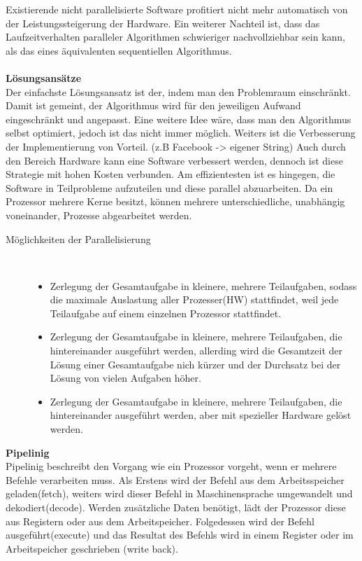 \documentclass[a4paper,12pt]{article}
\begin{document}
Existierende nicht parallelisierte Software profitiert nicht mehr automatisch von der Leistungssteigerung der Hardware. Ein weiterer Nachteil ist, dass das Laufzeitverhalten paralleler Algorithmen schwieriger nachvollziehbar sein kann, als das eines äquivalenten sequentiellen Algorithmus.\\\\
\textbf{Lösungsansätze\\}
Der einfachste Lösungsansatz ist der, indem man den Problemraum einschränkt. Damit ist gemeint, der Algorithmus wird für den jeweiligen Aufwand eingeschränkt und angepasst. Eine weitere Idee wäre, dass man den Algorithmus selbst optimiert, jedoch ist das nicht immer möglich. Weiters ist die Verbesserung der Implementierung von Vorteil. (z.B Facebook -> eigener String)
Auch durch den Bereich Hardware kann eine Software verbessert werden, dennoch ist diese Strategie mit hohen Kosten verbunden. Am effizientesten ist es hingegen, die Software in Teilprobleme aufzuteilen und diese parallel abzuarbeiten. Da ein Prozessor mehrere Kerne besitzt, können mehrere unterschiedliche, unabhängig voneinander, Prozesse abgearbeitet werden. 
\begin{description}
    \item[Möglichkeiten der Parallelisierung] ~\par
    \begin{itemize}
        \item Zerlegung der Gesamtaufgabe in kleinere, mehrere Teilaufgaben, sodass die maximale Auslastung aller Prozesser(HW) stattfindet, weil jede Teilaufgabe auf einem einzelnen Prozessor stattfindet.
        \item Zerlegung der Gesamtaufgabe in kleinere, mehrere Teilaufgaben, die hintereinander ausgeführt werden, allerding wird die Gesamtzeit der Lösung einer Gesamtaufgabe nich kürzer und der Durchsatz bei der Lösung von vielen Aufgaben höher.
        \item Zerlegung der Gesamtaufgabe in kleinere, mehrere Teilaufgaben, die hintereinander ausgeführt werden, aber mit spezieller Hardware gelöst werden.
    \end{itemize} 
\end{description}
\textbf{Pipelinig\\}
Pipelinig beschreibt den Vorgang wie ein Prozessor vorgeht, wenn er mehrere Befehle verarbeiten muss. Als Erstens wird der Befehl aus dem Arbeitsspeicher geladen(fetch), weiters wird dieser Befehl in Maschinensprache umgewandelt und dekodiert(decode). Werden zusätzliche Daten benötigt, lädt der Prozessor diese aus Registern oder aus dem Arbeitspeicher. Folgedessen wird der Befehl ausgeführt(execute) und das Resultat des Befehls wird in einem Register oder im Arbeitspeicher geschrieben (write back).
\end{document}
